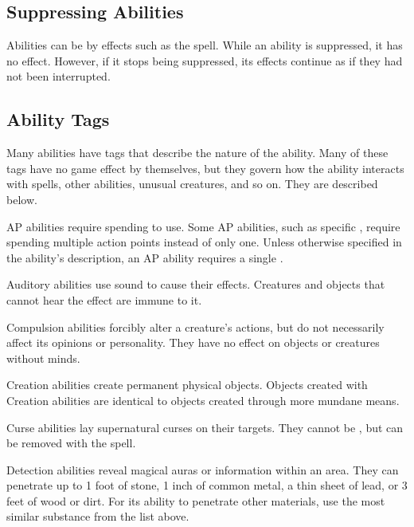     \subsection{Suppressing Abilities}\label{Suppressing Abilities}
        Abilities can be  by effects such as the  spell.
        While an ability is suppressed, it has no effect.
        However, if it stops being suppressed, its effects continue as if they had not been interrupted.

    \subsection{Ability Tags}\label{Ability Tags}

        Many abilities have tags that describe the nature of the ability.
        Many of these tags have no game effect by themselves, but they govern how the ability interacts with spells, other abilities, unusual creatures, and so on.
        They are described below.

         AP abilities require spending  to use.
        Some AP abilities, such as specific , require spending multiple action points instead of only one.
        Unless otherwise specified in the ability's description, an AP ability requires a single .

         Auditory abilities use sound to cause their effects.
        Creatures and objects that cannot hear the effect are immune to it.

         Compulsion abilities forcibly alter a creature's actions, but do not necessarily affect its opinions or personality.
        They have no effect on objects or creatures without minds.

         Creation abilities create permanent physical objects.
        Objects created with Creation abilities are identical to objects created through more mundane means.

         Curse abilities lay supernatural curses on their targets.
        They cannot be , but can be removed with the  spell.

         Detection abilities reveal magical auras or information within an area.
        They can penetrate up to 1 foot of stone, 1 inch of common metal, a thin sheet of lead, or 3 feet of wood or dirt.
        For its ability to penetrate other materials, use the most similar substance from the list above.


